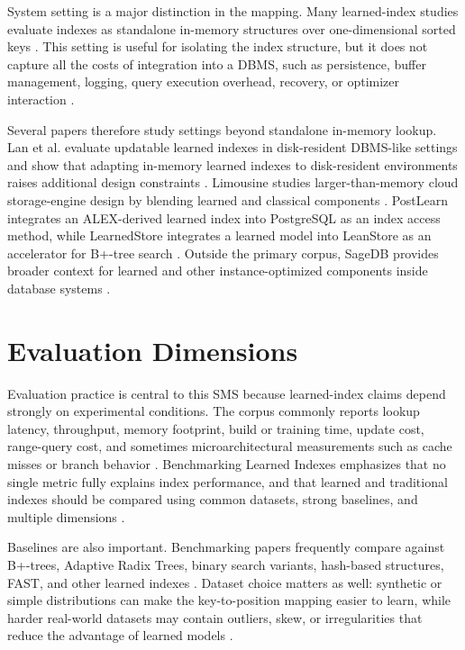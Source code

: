 \documentclass[a4paper, 12pt, twoside]{report}
\begin{document}
System setting is a major distinction in the mapping. Many learned-index studies evaluate indexes as standalone in-memory structures over one-dimensional sorted keys \cite{marcus2020benchmarking,sun2023learned,wongkham2022ready}. This setting is useful for isolating the index structure, but it does not capture all the costs of integration into a DBMS, such as persistence, buffer management, logging, query execution overhead, recovery, or optimizer interaction \cite{fuad2026postlearn}.

Several papers therefore study settings beyond standalone in-memory lookup. Lan et al. evaluate updatable learned indexes in disk-resident DBMS-like settings and show that adapting in-memory learned indexes to disk-resident environments raises additional design constraints \cite{lan2023disk}. Limousine studies larger-than-memory cloud storage-engine design by blending learned and classical components \cite{chatterjee2024limousine}. PostLearn integrates an ALEX-derived learned index into PostgreSQL as an index access method, while LearnedStore integrates a learned model into LeanStore as an accelerator for B+-tree search \cite{fuad2026postlearn,maharjan2023learnedstore}. Outside the primary corpus, SageDB provides broader context for learned and other instance-optimized components inside database systems \cite{ding2022sagedb}.

\section{Evaluation Dimensions}

Evaluation practice is central to this SMS because learned-index claims depend strongly on experimental conditions. The corpus commonly reports lookup latency, throughput, memory footprint, build or training time, update cost, range-query cost, and sometimes microarchitectural measurements such as cache misses or branch behavior \cite{marcus2020benchmarking}. Benchmarking Learned Indexes emphasizes that no single metric fully explains index performance, and that learned and traditional indexes should be compared using common datasets, strong baselines, and multiple dimensions \cite{marcus2020benchmarking}.

Baselines are also important. Benchmarking papers frequently compare against B+-trees, Adaptive Radix Trees, binary search variants, hash-based structures, FAST, and other learned indexes \cite{marcus2020benchmarking,sun2023learned,maltry2022critical}. Dataset choice matters as well: synthetic or simple distributions can make the key-to-position mapping easier to learn, while harder real-world datasets may contain outliers, skew, or irregularities that reduce the advantage of learned models \cite{marcus2020benchmarking}.
\end{document}
